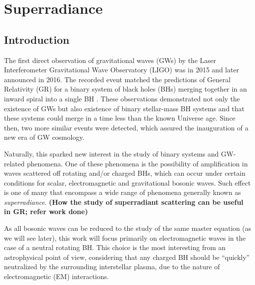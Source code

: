 
\chapter{Superradiance} %
\label{Chapter1}


\section{Introduction}

The first direct observation of gravitational waves (GWs) by the Laser Interferometer Gravitational Wave Observatory (LIGO) was in 2015 and later announced in 2016.
The recorded event matched the predictions of General Relativity (GR) for a binary system of black holes (BHs) merging together in an inward spiral into a single BH \cite{Abbott2016}.
These observations demonstrated not only the existence of GWs but also existence of binary stellar-mass BH systems and that these systems could merge in a time less than the known Universe age.
Since then, two more similar events were detected, which assured the inauguration of a new era of GW cosmology. 

Naturally, this sparked new interest in the study of binary systems and GW-related phenomena.
One of these phenomena is the possibility of amplification in waves scattered off rotating and/or charged BHs, which can occur under certain conditions for scalar, electromagnetic and gravitational bosonic waves.
Such effect is one of many that encompass a wide range of phenomena generally known as \emph{superradiance}. \textbf{(How the study of superradiant scattering can be useful in GR; refer work done)}

As all bosonic waves can be reduced to the study of the same master equation (as we will see later), this work will focus primarily on electromagnetic waves in the case of a neutral rotating BH.
This choice is the most interesting from an astrophysical point of view, considering that any charged BH should be ``quickly'' neutralized by the surrounding interstellar plasma, due to the nature of electromagnetic (EM) interactions.

